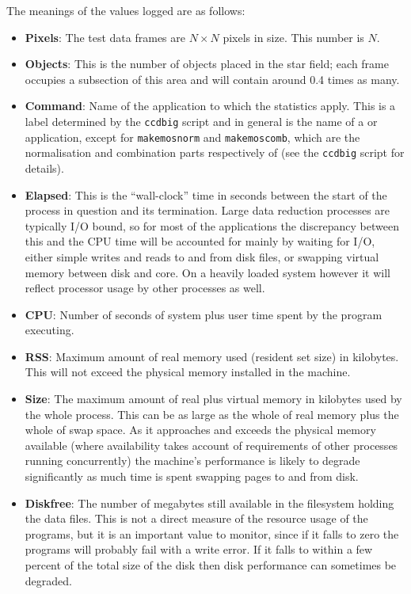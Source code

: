 The meanings of the values logged are as follows:
\begin{itemize}
%
\item {\bf Pixels}:
The test data frames are $N \times N$ pixels in size.
This number is $N$.
%
\item{\bf Objects}:
This is the number of objects placed in the star field;
each frame occupies a subsection of this area and will 
contain around 0.4 times as many.
%
\item {\bf Command}:
Name of the application to which the statistics apply.
This is a label determined by the {\tt ccdbig} script and in general
is the name of a {\CCDPref} or {\KAPPAref} application, 
except for {\tt makemosnorm} and {\tt makemoscomb},
which are the normalisation and combination parts respectively
of 
(see the {\tt ccdbig} script for details).
\item {\bf Elapsed}:
This is the ``wall-clock'' time in seconds between the start of the process
in question and its termination. 
Large data reduction processes are typically I/O bound, so
for most of the applications the discrepancy between this and the
CPU time will be accounted for mainly by waiting for I/O,
either simple writes and reads to and from disk files, 
or swapping virtual memory between disk and core.
On a heavily loaded system however it will reflect processor 
usage by other processes as well.
%
\item {\bf CPU}:
Number of seconds of system plus user time spent by the program executing.
%
\item {\bf RSS}:
Maximum amount of real memory used (resident set size) in kilobytes. 
This will not exceed the physical memory installed in the machine.
%
\item {\bf Size}:
The maximum amount of real plus virtual memory in kilobytes 
used by the whole process.
This can be as large as the whole of real memory plus the
whole of swap space. 
As it approaches and exceeds the physical memory available
(where availability takes account of requirements of other 
processes running concurrently)
the machine's performance is likely to degrade significantly 
as much time is spent swapping pages to and from disk.
%
\item {\bf Diskfree}:
The number of megabytes still available in the filesystem
holding the data files.
This is not a direct measure of the resource usage of the programs,
but it is an important value to monitor, 
since if it falls to zero the programs will probably fail with
a write error.
If it falls to within a few percent of the total size of the 
disk then disk performance can sometimes be degraded.
\end{itemize}


